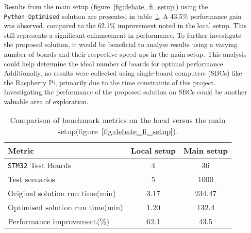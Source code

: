 Results from the main setup (figure~\ref{fig:debate_fi_setup}) using the \texttt{Python\_Optimised} solution are presented in table~\ref{tab:debate_metrics}. A 43.5\% performance gain was observed, compared to the 62.1\% improvement noted in the local setup. This still represents a significant enhancement in performance. To further investigate the proposed solution, it would be beneficial to analyse results using a varying number of boards and their respective speed-ups in the main setup. This analysis could help determine the ideal number of boards for optimal performance. Additionally, no results were collected using single-board computers (SBCs) like the Raspberry Pi, primarily due to the time constraints of this project. Investigating the performance of the proposed solution on SBCs could be another valuable area of exploration.

\begin{table}[htbp]
	\centering
	\begin{tabular}{@{}lcc@{}} %
		\toprule
		\textbf{Metric} & \textbf{Local setup} & \textbf{Main setup} \\
		\midrule
		\texttt{STM32} Test Boards & 4 & 36 \\
		Test scenarios & 5 & 1000 \\
		Original solution run time(min) & 3.17 & 234.47 \\
		Optimised solution run time(min) & 1.20 & 132.4 \\
		Performance improvement(\%) & 62.1 & 43.5 \\
		\bottomrule
	\end{tabular}
	\caption{Comparison of benchmark metrics on the local versus the main setup(figure~\ref{fig:debate_fi_setup}).}
	\label{tab:debate_metrics}
\end{table}